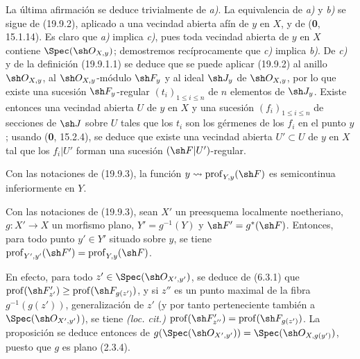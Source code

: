 La última afirmación se deduce trivialmente de \emph{a)}. La equivalencia de \emph{a)} y \emph{b)}
se sigue de (19.9.2), aplicado a una vecindad abierta afín de $y$ en $X$, y
de (\textbf{0}, 15.1.14). Es claro que \emph{a)} implica \emph{c)}, pues toda vecindad abierta de
$y$ en $X$ contiene $\Spec(\sh O_{X,y})$; demostremos recíprocamente que \emph{c)}
implica \emph{b)}. De \emph{c)} y de la definición (19.9.1.1) se deduce que 
se puede aplicar
(19.9.2) al anillo $\sh O_{X,y}$, al $\sh O_{X,y}$-módulo $\sh F_y$ y al ideal
$\sh J_y$ de $\sh O_{X,y}$, por lo que existe una sucesión $\sh F_y$-regular
$(t_i)_{1\leq i\leq n}$ de $n$ elementos de $\sh J_y$. Existe entonces una
vecindad abierta $U$ de $y$ en $X$ y una sucesión $(f_i)_{1\leq i\leq n}$ de
secciones de $\sh J$ sobre $U$ tales que los $t_i$ son los gérmenes de los
$f_i$ en el punto $y$; usando (\textbf{0}, 15.2.4), se deduce que existe una
vecindad abierta $U'\subset U$ de $y$ en $X$ tal que los $f_i|U'$ forman una
sucesión $(\sh F|U')$-regular.



\begin{corollary}[19.9.4]
\label{IV.19.9.4}
Con las notaciones de \textup{(19.9.3)}, la función
$y\leadsto\operatorname{prof}_{Y,y}(\sh F)$ es semicontinua inferiormente en
$Y$.
\end{corollary}

\begin{proposition}[19.9.5]
\label{IV.19.9.5}
Con las notaciones de \textup{(19.9.3)}, sean $X'$ un preesquema localmente noetheriano,
$g:X'\to X$ un morfismo plano, $Y'=g^{-1}(Y)$ y $\sh F'=g^*(\sh F)$. Entonces,
para todo punto $y'\in Y'$ situado sobre $y$, se tiene
$\operatorname{prof}_{Y',y'}(\sh F')=\operatorname{prof}_{Y,y}(\sh F)$.
\end{proposition}

En efecto, para todo $z'\in\Spec(\sh O_{X',y'})$, se deduce de (6.3.1) que
$\operatorname{prof}(\sh F'_{z'})\geq\operatorname{prof}(\sh F_{g(z')})$,
y si $z''$ es un punto maximal de la fibra $g^{-1}(g(z'))$, generalización de
$z'$ (y por tanto perteneciente también a $\Spec(\sh O_{X',y'})$), se tiene
\emph{(loc. cit.)}
$\operatorname{prof}(\sh F'_{z''})=\operatorname{prof}(\sh F_{g(z')})$.
La proposición se deduce entonces de
$g(\Spec(\sh O_{X',y'}))=\Spec(\sh O_{X,g(y')})$, puesto que $g$ es plano
(2.3.4).

